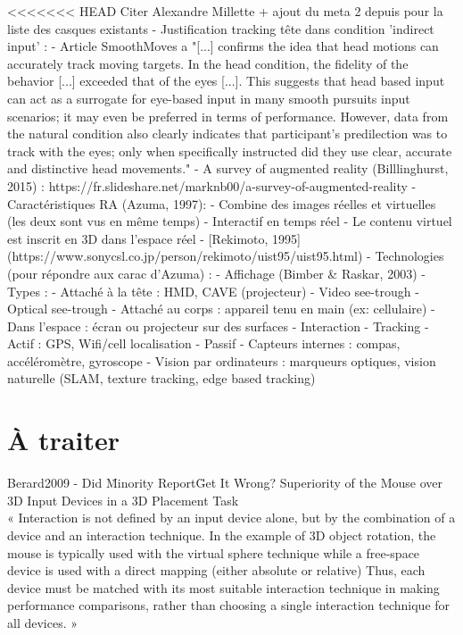 <<<<<<< HEAD
Citer Alexandre Millette + ajout du meta 2 depuis pour la liste des casques existants
- Justification tracking tête dans condition 'indirect input' : 
    - Article SmoothMoves a "[...] confirms the idea that head motions can accurately track moving targets. In the head condition, the fidelity of the behavior [...] exceeded that of the eyes [...]. This suggests that head based input can act as a surrogate for eye-based input in many smooth pursuits input scenarios; it may even be preferred in terms of performance. However, data from the natural condition also clearly indicates that participant’s predilection was to track with the eyes; only when specifically instructed did they use clear, accurate and distinctive head movements."
- A survey of augmented reality (Billlinghurst, 2015) : https://fr.slideshare.net/marknb00/a-survey-of-augmented-reality
    - Caractéristiques RA (Azuma, 1997):
        - Combine des images réelles et virtuelles (les deux sont vus en même temps)
        - Interactif en temps réel
        - Le contenu virtuel est inscrit en 3D dans l'espace réel
    - [Rekimoto, 1995](https://www.sonycsl.co.jp/person/rekimoto/uist95/uist95.html)
    - Technologies (pour répondre aux carac d'Azuma) :
        - Affichage (Bimber \& Raskar, 2003)
            - Types :
                - Attaché à la tête : HMD, CAVE (projecteur)
                    - Video see-trough
                    - Optical see-trough
                - Attaché au corps : appareil tenu en main (ex: cellulaire)
                - Dans l'espace : écran ou projecteur sur des surfaces
        - Interaction
        - Tracking
            - Actif : GPS, Wifi/cell localisation
            - Passif
                - Capteurs internes : compas, accéléromètre, gyroscope
                - Vision par ordinateurs : marqueurs optiques, vision naturelle (SLAM, texture tracking, edge based tracking)


\section{À traiter}
Berard2009 - Did \"Minority Report\" Get It Wrong? Superiority of the Mouse over 3D Input Devices in a 3D Placement Task\\
« Interaction is not defined by an input device alone, but by the combination of a device and an interaction technique. In the example of 3D object rotation, the mouse is typically used with the virtual sphere technique while a free-space device is used with a direct mapping (either absolute or relative) Thus, each device must be matched with its most suitable interaction technique in making performance comparisons, rather than choosing a single interaction technique for all devices. »

